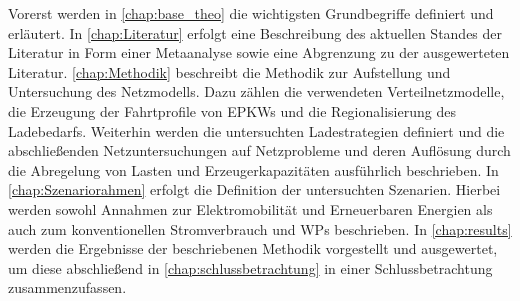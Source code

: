 Vorerst werden in \autoref{chap:base_theo} die wichtigsten Grundbegriffe definiert und erläutert.
In \autoref{chap:Literatur} erfolgt eine Beschreibung des aktuellen Standes der Literatur in Form einer Metaanalyse sowie eine Abgrenzung zu der ausgewerteten Literatur.
\autoref{chap:Methodik} beschreibt die Methodik zur Aufstellung und Untersuchung des Netzmodells.
Dazu zählen die verwendeten Verteilnetzmodelle, die Erzeugung der Fahrtprofile von \glspl{EPKW} und die Regionalisierung des Ladebedarfs.
Weiterhin werden die untersuchten Ladestrategien definiert und die abschließenden Netzuntersuchungen auf Netzprobleme und deren Auflösung durch die Abregelung von Lasten und Erzeugerkapazitäten ausführlich beschrieben.
In \autoref{chap:Szenariorahmen} erfolgt die Definition der untersuchten Szenarien.
Hierbei werden sowohl Annahmen zur Elektromobilität und Erneuerbaren Energien als auch zum konventionellen Stromverbrauch und \glspl{WP} beschrieben.
In \autoref{chap:results} werden die Ergebnisse der beschriebenen Methodik vorgestellt und ausgewertet, um diese abschließend in \autoref{chap:schlussbetrachtung} in einer Schlussbetrachtung zusammenzufassen.

\clearpage
